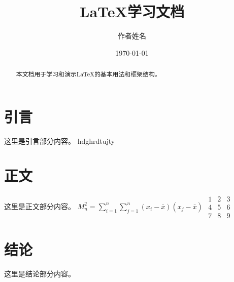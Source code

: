 \documentclass{ctexart}
\title{LaTeX学习文档}
\author{作者姓名}
\date{\today}
\begin{document}
\maketitle

\begin{abstract}
本文档用于学习和演示LaTeX的基本用法和框架结构。
\end{abstract}

\section{引言}
这里是引言部分内容。
hdghrdtujty
\section{正文}
这里是正文部分内容。
$ M_n^2 = \sum_{i=1}^n \sum_{j=1}^n (x_i - \bar{x})(x_j - \bar{x}) $
\clearpage
$
\begin{matrix}
1 & 2 & 3 \\
4 & 5 & 6 \\
7 & 8 & 9
\end{matrix}
$

\section{结论}
这里是结论部分内容。
\end{document}
